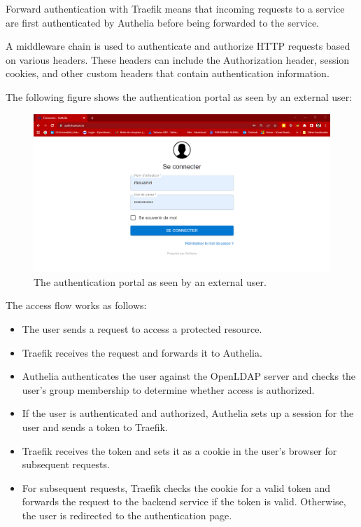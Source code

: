 \hspace{7mm}Forward authentication with Traefik means that incoming requests to a service are first authenticated by Authelia before being forwarded to the service.

\hspace{7mm}A middleware chain is used to authenticate and authorize HTTP requests based on various headers. These headers can include the Authorization header, session cookies, and other custom headers that contain authentication information. 

\hspace{7mm}The following figure shows the authentication portal as seen by an external user: 
\begin{figure}[H]\centering
\includegraphics[width=1.0\textwidth,angle=00]{assets/f55.png}
\caption{The authentication portal as seen by an external user.}
\label{fig:f55}
\end{figure}

\hspace{7mm}The access flow works as follows: 
\begin{itemize}[label={--}]
\item The user sends a request to access a protected resource. 
\item  Traefik receives the request and forwards it to Authelia. 
\item  Authelia authenticates the user against the OpenLDAP server and checks the user's group membership to determine whether access is authorized. 
\item  If the user is authenticated and authorized, Authelia sets up a session for the user and sends a token to Traefik. 
\item  Traefik receives the token and sets it as a cookie in the user's browser for subsequent requests. 
\item  For subsequent requests, Traefik checks the cookie for a valid token and forwards the request to the backend service if the token is valid. Otherwise, the user is redirected to the authentication page.  
\end{itemize}

